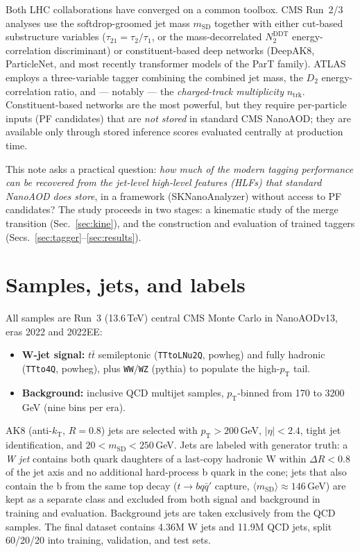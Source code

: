 \documentclass[11pt,a4paper]{article}
\newcommand{\pt}{\ensuremath{p_{\mathrm{T}}}}
\newcommand{\msd}{\ensuremath{m_{\mathrm{SD}}}}
\begin{document}
Both LHC collaborations have converged on a common toolbox. CMS Run~2/3
analyses use the softdrop-groomed jet mass \msd{} together with either
cut-based substructure variables ($\tau_{21}=\tau_2/\tau_1$, or the
mass-decorrelated $N_2^{\mathrm{DDT}}$ energy-correlation discriminant) or
constituent-based deep networks (DeepAK8, ParticleNet, and most recently
transformer models of the ParT family). ATLAS employs a three-variable tagger
combining the combined jet mass, the $D_2$ energy-correlation ratio, and
--- notably --- the \emph{charged-track multiplicity} $n_{\mathrm{trk}}$.
Constituent-based networks are the most powerful, but they require
per-particle inputs (PF candidates) that are \emph{not stored} in standard
CMS NanoAOD; they are available only through stored inference scores
evaluated centrally at production time.

This note asks a practical question: \emph{how much of the modern tagging
performance can be recovered from the jet-level high-level features (HLFs)
that standard NanoAOD does store}, in a framework (SKNanoAnalyzer) without
access to PF candidates? The study proceeds in two stages: a kinematic study
of the merge transition (Sec.~\ref{sec:kine}), and the construction and
evaluation of trained taggers (Secs.~\ref{sec:tagger}--\ref{sec:results}).

\section{Samples, jets, and labels}
\label{sec:samples}

All samples are Run~3 (13.6\,TeV) central CMS Monte Carlo in NanoAODv13,
eras 2022 and 2022EE:
\begin{itemize}
  \item \textbf{W-jet signal:} $t\bar t$ semileptonic (\texttt{TTtoLNu2Q},
    powheg) and fully hadronic (\texttt{TTto4Q}, powheg), plus
    \texttt{WW}/\texttt{WZ} (pythia) to populate the high-\pt{} tail.
  \item \textbf{Background:} inclusive QCD multijet samples, \pt-binned from
    170 to 3200\,GeV (nine bins per era).
\end{itemize}
AK8 (anti-$k_{\mathrm{T}}$, $R=0.8$) jets are selected with
$\pt > 200\,$GeV, $|\eta| < 2.4$, tight jet identification, and
$20 < \msd < 250\,$GeV. Jets are labeled with generator truth: a
\emph{W jet} contains both quark daughters of a last-copy hadronic W within
$\Delta R < 0.8$ of the jet axis and no additional hard-process b quark in
the cone; jets that also contain the b from the same top decay
($t \to bq\bar q'$ capture, $\langle\msd\rangle \approx 146\,$GeV) are kept
as a separate class and excluded from both signal and background in training
and evaluation. Background jets are taken exclusively from the QCD samples.
The final dataset contains 4.36M W jets and 11.9M QCD jets, split
60/20/20 into training, validation, and test sets.
\end{document}

